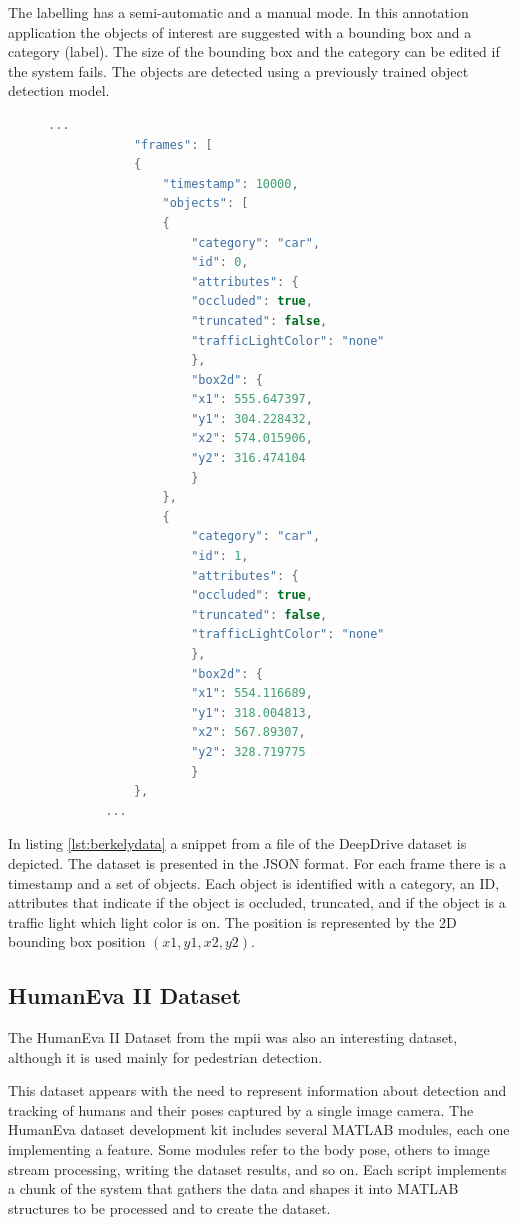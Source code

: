 The labelling has a semi-automatic and a manual mode. In this annotation application the objects of interest are suggested with a bounding box and a category (label). The size of the bounding box and the category can be edited if the system fails. The objects are detected using a previously trained object detection model. 

\begin{figure}
	\begin{center}
		\begin{lstlisting}[label={lst:berkelydata}, caption={DeepDrive dataset file snippet.},language=C++]
		...
		    "frames": [
		    {
			    "timestamp": 10000,
			    "objects": [
			    {
				    "category": "car",
				    "id": 0,
				    "attributes": {
				    "occluded": true,
				    "truncated": false,
				    "trafficLightColor": "none"
				    },
				    "box2d": {
				    "x1": 555.647397,
				    "y1": 304.228432,
				    "x2": 574.015906,
				    "y2": 316.474104
				    }
			    },
			    {
				    "category": "car",
				    "id": 1,
				    "attributes": {
				    "occluded": true,
				    "truncated": false,
				    "trafficLightColor": "none"
				    },
				    "box2d": {
				    "x1": 554.116689,
				    "y1": 318.004813,
				    "x2": 567.89307,
				    "y2": 328.719775
				    }
		    },
		...	\end{lstlisting}
	\end{center}
\end{figure}

In listing \ref{lst:berkelydata} a snippet from a file of the DeepDrive dataset is depicted. The dataset is presented in the JSON format. For each frame there is a timestamp and a set of objects. Each object is identified with a category, an ID, attributes that indicate if the object is occluded, truncated, and if the object is a traffic light which light color is on. The position is represented by the 2D bounding box position $(x1,y1,x2,y2)$.

	
\subsection{HumanEva II Dataset}
The HumanEva II Dataset from the \gls{mpii} was also an interesting dataset, although it is used mainly for pedestrian detection.

This dataset appears with the need to represent information about detection and tracking of humans and their poses captured by a single image camera. The HumanEva dataset development kit includes several MATLAB modules, each one implementing a feature. Some modules refer to the body pose, others to image stream processing, writing the dataset results, and so on. Each script implements a chunk of the system that gathers the data and shapes it into MATLAB structures to be processed and to create the dataset.

